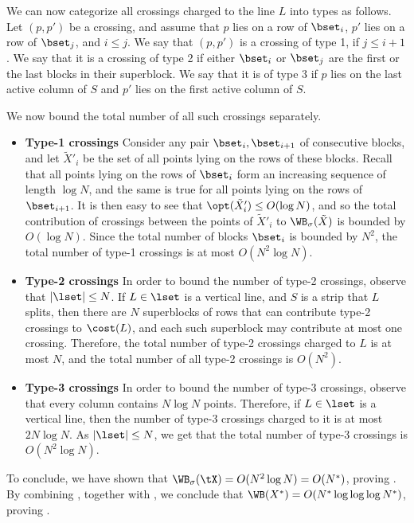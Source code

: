 \documentclass{toc}
\begin{document}
We can now categorize all crossings charged to the line $L$ into types as follows. Let $(p,p')$ be a crossing, and assume that $p$ lies on a row of $\bset_i$, $p'$ lies on a row of $\bset_j$, and $i\leq j$. We say that $(p,p')$ is a crossing of type 1, if $j\leq i+1$. We say that 
it is a crossing of type 2 if either $\bset_i$ or $\bset_j$ are the first or the last blocks in their superblock. We say that it is of type 3 if $p$ lies on the last active column of $S$ and $p'$ lies on the first active column of $S$.

We now bound the total number of all such crossings separately.

\begin{itemize}
    \item {\bf Type-1 crossings}
Consider any pair $\bset_i,\bset_{i+1}$ of consecutive blocks, and let $\tilde X'_i$ be the set of all points lying on the rows of these blocks. Recall that all points lying on the rows of $\bset_i$ form an increasing sequence of length $\log N$, and the same is true for all points lying on the rows of $\bset_{i+1}$. It is then easy to see that $\opt(\tilde X'_i)\leq O(\log N)$, and so the total contribution of crossings between the points of $\tilde X'_i$ to $\WB_{\sigma}(\tilde X)$ is bounded by $O(\log N)$. Since the total number of blocks $\bset_i$ is bounded by $N^2$, the total number of type-1 crossings is at most $O(N^2\log N)$.

\item {\bf Type-2 crossings}
In order to bound the number of type-2 crossings, observe that $|\lset|\leq N$. If $L\in \lset$ is a vertical line, and $S$ is a strip that $L$ splits, then there are $N$ superblocks of rows that can contribute type-2 crossings to $\cost(L)$, and each such superblock may contribute at most one crossing. Therefore, the total number of type-2 crossings charged to $L$ is at most $N$, and the total number of all type-2 crossings is $O(N^2)$.

\item {\bf Type-3 crossings}
In order to bound the number of type-3 crossings, observe that every column contains $N\log N$ points. Therefore, if $L\in \lset$ is a vertical line, then the number of type-3 crossings charged to it is at most $2N\log N$. As $|\lset|\leq N$, we get that the total number of type-3 crossings is $O(N^2\log N)$.

\end{itemize}



To conclude, we have shown that $\WB_{\sigma}(\tX)=O(N^2\log N)=O(N^*)$, proving . By combining  , together with , we conclude that $\WB(X^*)=O(N^*\log\log\log N^*)$, proving .
\end{document}
